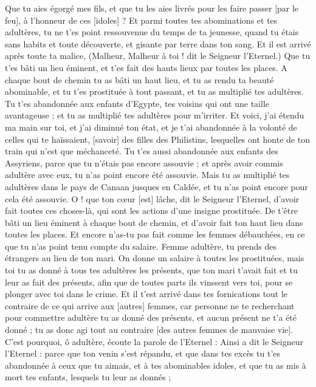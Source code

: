 \begin{multicols}{2}
Que tu aies égorgé mes fils, et que tu les aies livrés pour les faire passer [par le feu], à l'honneur de ces [idoles] ?
Et parmi toutes tes abominations et tes adultères, tu ne t'es point ressouvenue du temps de ta jeunesse, quand tu étais sans habits et toute découverte, et gisante par terre dans ton sang.
Et il est arrivé après toute ta malice, (Malheur, Malheur à toi ! dit le Seigneur l'Eternel.)
Que tu t'es bâti un lieu éminent, et t'es fait des hauts lieux par toutes les places.
A chaque bout de chemin tu as bâti un haut lieu, et tu as rendu ta beauté abominable, et tu t'es prostituée à tout passant, et tu as multiplié tes adultères.
Tu t'es abandonnée aux enfants d'Egypte, tes voisins qui ont une taille avantageuse ; et tu as multiplié tes adultères pour m'irriter.
Et voici, j'ai étendu ma main sur toi, et j'ai diminué ton état, et je t'ai abandonnée à la volonté de celles qui te haïssaient, [savoir] des filles des Philistins, lesquelles ont honte de ton train qui n'est que méchanceté.
Tu t'es aussi abandonnée aux enfants des Assyriens, parce que tu n'étais pas encore assouvie ; et après avoir commis adultère avec eux, tu n'as point encore été assouvie.
Mais tu as multiplié tes adultères dans le pays de Canaan jusques en Caldée, et tu n'as point encore pour cela été assouvie.
O ! que ton cœur [est] lâche, dit le Seigneur l'Eternel, d'avoir fait toutes ces choses-là, qui sont les actions d'une insigne prostituée.
De t'être bâti un lieu éminent à chaque bout de chemin, et d'avoir fait ton haut lieu dans toutes les places. Et encore n'as-tu pas fait comme les femmes débauchées, en ce que tu n'as point tenu compte du salaire.
Femme adultère, tu prends des étrangers au lieu de ton mari.
On donne un salaire à toutes les prostituées, mais toi tu as donné à tous tes adultères les présents, que ton mari t'avait fait et tu leur as fait des présents, afin que de toutes parts ils vinssent vers toi, pour se plonger avec toi dans le crime.
Et il t'est arrivé dans tes fornications tout le contraire de ce qui arrive aux [autres] femmes, car personne ne te recherchant pour commettre adultère tu as donné des présents, et aucun présent ne t'a été donné ; tu as donc agi tout au contraire [des autres femmes de mauvaise vie].
C'est pourquoi, ô adultère, écoute la parole de l'Eternel :
Ainsi a dit le Seigneur l'Eternel : parce que ton venin s'est répandu, et que dans tes excès tu t'es abandonnée à ceux que tu aimais, et à tes abominables idoles, et que tu as mis à mort tes enfants, lesquels tu leur as donnés ;

\end{multicols}
